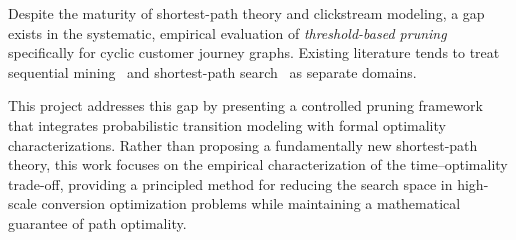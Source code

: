 Despite the maturity of shortest-path theory and clickstream modeling, a gap exists in the systematic, empirical evaluation of \emph{threshold-based pruning} specifically for cyclic customer journey graphs. Existing literature tends to treat sequential mining~\citep{pei2001prefixspan} and shortest-path search~\citep{dijkstra1959} as separate domains.

This project addresses this gap by presenting a controlled pruning framework that integrates probabilistic transition modeling with formal optimality characterizations. Rather than proposing a fundamentally new shortest-path theory, this work focuses on the empirical characterization of the time--optimality trade-off, providing a principled method for reducing the search space in high-scale conversion optimization problems while maintaining a mathematical guarantee of path optimality.
